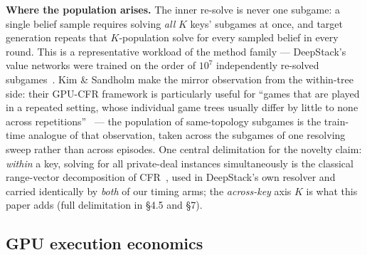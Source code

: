 \documentclass[11pt]{article}
\begin{document}
\textbf{Where the population arises.} The inner re-solve is never one subgame: a single
belief sample requires solving \emph{all} $K$ keys' subgames at once, and target
generation repeats that $K$-population solve for every sampled belief in every round.
This is a representative workload of the method family --- DeepStack's value networks were
trained on the order of $10^7$ independently re-solved subgames~\citep{Moravcik2017}.
Kim \& Sandholm make the mirror observation from the within-tree side: their GPU-CFR
framework is particularly useful for ``games that are played in a repeated setting,
whose individual game trees usually differ by little to none across
repetitions''~\citep{KimSandholm2026} --- the population of same-topology subgames is
the train-time analogue of that observation, taken across the subgames of one resolving
sweep rather than across episodes.
One central delimitation for the novelty claim: \emph{within} a key, solving for
all private-deal instances simultaneously is the classical range-vector decomposition of
CFR~\citep{Johanson2011,Johanson2012}, used in DeepStack's own resolver and carried
identically by \emph{both} of our timing arms; the \emph{across-key} axis $K$ is what
this paper adds (full delimitation in \S4.5 and \S7).

\subsection{GPU execution economics}
\end{document}
